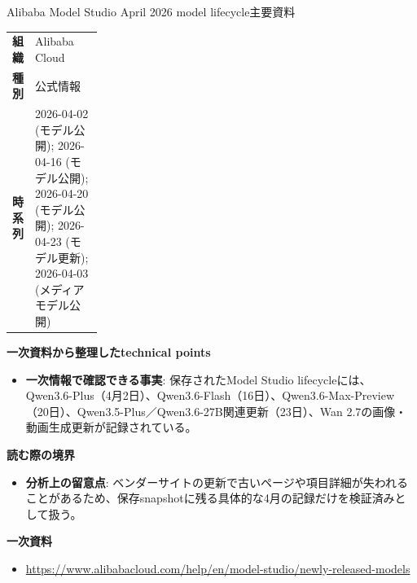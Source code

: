 \begin{technicalnote}{Alibaba Model Studio April 2026 model lifecycle}{主要資料}
\begingroup
\begin{tabularx}{\linewidth}{@{}>{\bfseries}p{0.22\linewidth}X@{}}
組織 & Alibaba Cloud \\
種別 & 公式情報 \\
時系列 & 2026-04-02 (モデル公開); 2026-04-16 (モデル公開); 2026-04-20 (モデル公開); 2026-04-23 (モデル更新); 2026-04-03 (メディアモデル公開) \\
\end{tabularx}
\smallskip
{\bfseries 一次資料から整理したtechnical points}
\begin{itemize}[leftmargin=1.5em,itemsep=0.35em]
\item \textbf{一次情報で確認できる事実}: 保存されたModel Studio lifecycleには、Qwen3.6-Plus（4月2日）、Qwen3.6-Flash（16日）、Qwen3.6-Max-Preview（20日）、Qwen3.5-Plus／Qwen3.6-27B関連更新（23日）、Wan 2.7の画像・動画生成更新が記録されている。
\end{itemize}
{\bfseries 読む際の境界}
\begin{itemize}[leftmargin=1.5em,itemsep=0.35em]
\item \textbf{分析上の留意点}: ベンダーサイトの更新で古いページや項目詳細が失われることがあるため、保存snapshotに残る具体的な4月の記録だけを検証済みとして扱う。
\end{itemize}
\begin{samepage}
{\bfseries 一次資料}
\begingroup\sloppy
\begin{itemize}[leftmargin=1.5em,itemsep=0.25em]
\item {\scriptsize\url{https://www.alibabacloud.com/help/en/model-studio/newly-released-models}}
\end{itemize}
\endgroup
\end{samepage}
\endgroup
\end{technicalnote}
\medskip

